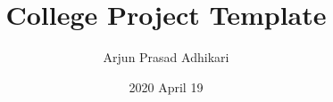 \documentclass[a4paper, 14pt, oneside]{report}
\title{College Project Template}
\author{Arjun Prasad Adhikari}
\date{2020 April 19}
\begin{document}
	
	
	\begin{description}
	

		
		
		
		
		\tableofcontents
		\listoffigures
		\listoftables
		
				
		
		
		
		
		
		

	\end{description}
	
	
	
\end{document}
